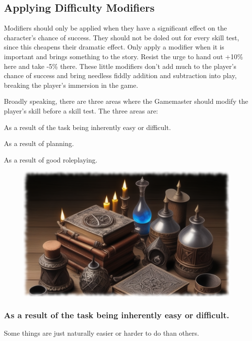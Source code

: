 \subsection{Applying Difficulty Modifiers}
\label{ssec:when-to-apply-difficulty-modifies}
Modifiers should only be applied when they have a significant effect on the character’s chance of success. They should not be doled out for every skill test, since this cheapens their dramatic effect. Only apply a modifier when it is important and brings something to the story. Resist the urge to hand out +10\% here and take {-5\%} there. These little modifiers don’t add much to the player’s chance of success and bring needless fiddly addition and subtraction into play, breaking the player’s immersion in the game.

Broadly speaking, there are three areas where the Gamemaster should modify the player’s skill before a skill test. The three areas are:

\begin{rpg-list}
	\item As a result of the task being inherently easy or difficult.\\
	\item As a result of planning.\\
	\item As a result of good roleplaying.
\end{rpg-list}


\begin{figure}[h]
\begin{center}
\includegraphics[scale=0.24]{img/ai-images/book-and-bottles.png}
\end{center}
\end{figure}

\subsubsection{As a result of the task being inherently easy or difficult.}
Some things are just naturally easier or harder to do than others. 

